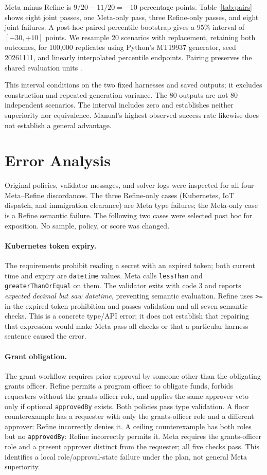 \documentclass[11pt]{article}
\begin{document}
Meta minus Refine is $9/20-11/20=-10$ percentage points. Table~\ref{tab:pairs} shows eight joint passes, one Meta-only pass, three Refine-only passes, and eight joint failures. A post-hoc paired percentile bootstrap gives a 95\% interval of $[-30,+10]$ points. We resample 20 scenarios with replacement, retaining both outcomes, for 100,000 replicates using Python's MT19937 generator, seed 20261111, and linearly interpolated percentile endpoints. Pairing preserves the shared evaluation units \citep{koehn2004statistical}.

This interval conditions on the two fixed harnesses and saved outputs; it excludes construction and repeated-generation variance. The 80 outputs are not 80 independent scenarios. The interval includes zero and establishes neither superiority nor equivalence. Manual's highest observed success rate likewise does not establish a general advantage.

\section{Error Analysis}
Original policies, validator messages, and solver logs were inspected for all four Meta--Refine discordances. The three Refine-only cases (Kubernetes, IoT dispatch, and immigration clearance) are Meta type failures; the Meta-only case is a Refine semantic failure. The following two cases were selected post hoc for exposition. No sample, policy, or score was changed.

\paragraph{Kubernetes token expiry.}
The requirements prohibit reading a secret with an expired token; both current time and expiry are \texttt{datetime} values. Meta calls \texttt{lessThan} and \texttt{greaterThanOrEqual} on them. The validator exits with code 3 and reports \emph{expected decimal but saw datetime}, preventing semantic evaluation. Refine uses \texttt{>=} in the expired-token prohibition and passes validation and all seven semantic checks. This is a concrete type/API error; it does not establish that repairing that expression would make Meta pass all checks or that a particular harness sentence caused the error.

\paragraph{Grant obligation.}
The grant workflow requires prior approval by someone other than the obligating grants officer. Refine permits a program officer to obligate funds, forbids requesters without the grants-officer role, and applies the same-approver veto only if optional \texttt{approvedBy} exists. Both policies pass type validation. A floor counterexample has a requester with only the grants-officer role and a different approver: Refine incorrectly denies it. A ceiling counterexample has both roles but no \texttt{approvedBy}: Refine incorrectly permits it. Meta requires the grants-officer role and a present approver distinct from the requester; all five checks pass. This identifies a local role/approval-state failure under the plan, not general Meta superiority.
\end{document}
